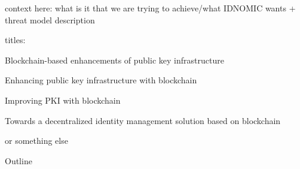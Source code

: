 \documentclass[11pt]{beamer}
\begin{document}
\begin{frame}
context here:
what is it that we are trying to achieve/what IDNOMIC wants + threat model description
\end{frame}


\begin{frame}
titles:

Blockchain-based enhancements of public key infrastructure

Enhancing public key infrastructure with blockchain

Improving PKI with blockchain

Towards a decentralized identity management solution based on blockchain

or something else
\end{frame}


\begin{frame}{Outline}
\tableofcontents
\end{frame}









\end{document}
